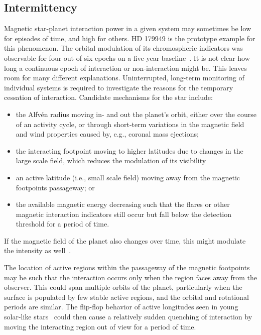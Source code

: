 \documentclass[twocolumn]{aastex631}
\begin{document}
\subsection{Intermittency}
\label{sec:discussion:intermittency}
Magnetic star-planet interaction power in a given system may sometimes be low for episodes of time, and high for others. HD 179949 is the prototype example for this phenomenon. The orbital modulation of its chromospheric indicators was observable for four out of six epochs on a five-year baseline~\citep{shkolnik2003evidence,shkolnik2008nature}. It is not clear how long a continuous epoch of interaction or non-interaction might be. This leaves room for many different explanations. Uninterrupted, long-term monitoring of individual systems is required to investigate the reasons for the temporary cessation of interaction. Candidate mechanisms for the star include: 
\begin{itemize}
    \item the Alfv\'en radius moving in- and out the planet's orbit, either over the course of an activity cycle, or through short-term variations in the magnetic field and wind properties caused by, e.g., coronal mass ejections;
    \item the interacting footpoint moving to higher latitudes due to changes in the large scale field, which reduces the modulation of its visibility 
    \item an active latitude (i.e., small scale field) moving away from the magnetic footpoints passageway; or
    \item the available magnetic energy decreasing such that the flares or other magnetic interaction indicators still occur but fall below the detection threshold for a period of time.
\end{itemize}

If the magnetic field of the planet also changes over time, this might modulate the intensity as well~\citep[e.g.][]{turnpenney2018exoplanetinduced}.

The location of active regions within the passageway of the magnetic footpoints may be such that the interaction occurs only when the region faces away from the observer. This could span multiple orbits of the planet, particularly when the surface is populated by few stable active regions, and the orbital and rotational periods are similar. The flip-flop behavior of active longitudes seen in young solar-like stars~\citep{berdyugina2005starspots} could then cause a relatively sudden quenching of interaction by moving the interacting region out of view for a period of time. 
\end{document}
